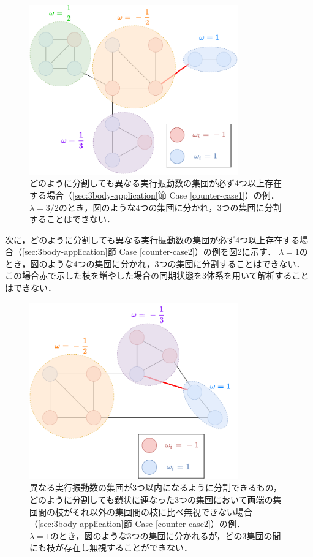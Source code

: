 \documentclass[../main]{subfiles}
\begin{document}
\begin{figure}[tbp]
    \centering
    \includegraphics[width=90mm]{./images/three-body-counter1.pdf}
    \centering
    \caption{どのように分割しても異なる実行振動数の集団が必ず4つ以上存在する場合（\ref{sec:3body-application}節 Case \ref{counter-case1}）の例．\\
    $\lambda=3/2$のとき，図のような4つの集団に分かれ，3つの集団に分割することはできない．}
    \label{fig:3body-counter1}
\end{figure}

次に，どのように分割しても異なる実行振動数の集団が必ず4つ以上存在する場合（\ref{sec:3body-application}節 Case \ref{counter-case2}）の例を図\ref{fig:3body-counter2}に示す．
$\lambda=1$のとき，図のような4つの集団に分かれ，3つの集団に分割することはできない．
この場合赤で示した枝を増やした場合の同期状態を3体系を用いて解析することはできない．

\begin{figure}[tbp]
    \centering
    \includegraphics[width=90mm]{./images/three-body-counter2.pdf}
    \centering
    \caption{異なる実行振動数の集団が3つ以内になるように分割できるもの，どのように分割しても鎖状に連なった3つの集団において両端の集団間の枝がそれ以外の集団間の枝に比べ無視できない場合（\ref{sec:3body-application}節 Case \ref{counter-case2}）の例．\\
    $\lambda=1$のとき，図のような3つの集団に分かれるが，どの3集団の間にも枝が存在し無視することができない．}
    \label{fig:3body-counter2}
\end{figure}
\end{document}
